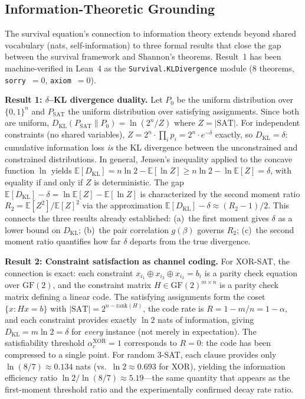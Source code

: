 \documentclass[11pt,a4paper]{article}
\begin{document}
\subsection{Information-Theoretic Grounding}
\label{sec:info-theory-grounding}

The survival equation's connection to information theory extends beyond shared vocabulary (nats, self-information) to three formal results that close the gap between the survival framework and Shannon's theorems. Result~1 has been machine-verified in Lean~4 as the \texttt{Survival.KLDivergence} module (8 theorems, \texttt{sorry}~$= 0$, \texttt{axiom}~$= 0$).

\textbf{Result 1: $\delta$--KL divergence duality.} Let $P_0$ be the uniform distribution over $\{0,1\}^n$ and $P_{\text{SAT}}$ the uniform distribution over satisfying assignments. Since both are uniform, $D_{\text{KL}}(P_{\text{SAT}} \| P_0) = \ln(2^n / Z)$ where $Z = |\text{SAT}|$. For independent constraints (no shared variables), $Z = 2^n \cdot \prod_i p_i = 2^n \cdot e^{-\delta}$ exactly, so $D_{\text{KL}} = \delta$: cumulative information loss \emph{is} the KL divergence between the unconstrained and constrained distributions. In general, Jensen's inequality applied to the concave function $\ln$ yields $\mathbb{E}[D_{\text{KL}}] = n \ln 2 - \mathbb{E}[\ln Z] \geq n \ln 2 - \ln \mathbb{E}[Z] = \delta$, with equality if and only if $Z$ is deterministic. The gap $\mathbb{E}[D_{\text{KL}}] - \delta = \ln \mathbb{E}[Z] - \mathbb{E}[\ln Z]$ is characterized by the second moment ratio $R_2 = \mathbb{E}[Z^2]/\mathbb{E}[Z]^2$ via the approximation $\mathbb{E}[D_{\text{KL}}] - \delta \approx (R_2 - 1)/2$. This connects the three results already established: (a)~the first moment gives $\delta$ as a lower bound on $D_{\text{KL}}$; (b)~the pair correlation $g(\beta)$ governs $R_2$; (c)~the second moment ratio quantifies how far $\delta$ departs from the true divergence.

\textbf{Result 2: Constraint satisfaction as channel coding.} For XOR-SAT, the connection is exact: each constraint $x_{i_1} \oplus x_{i_2} \oplus x_{i_3} = b_i$ is a parity check equation over $\text{GF}(2)$, and the constraint matrix $H \in \text{GF}(2)^{m \times n}$ is a parity check matrix defining a linear code. The satisfying assignments form the coset $\{x : Hx = b\}$ with $|{\text{SAT}}| = 2^{n - \text{rank}(H)}$, the code rate is $R = 1 - m/n = 1 - \alpha$, and each constraint provides exactly $\ln 2$ nats of information, giving $D_{\text{KL}} = m \ln 2 = \delta$ for \emph{every} instance (not merely in expectation). The satisfiability threshold $\alpha_c^{\text{XOR}} = 1$ corresponds to $R = 0$: the code has been compressed to a single point. For random 3-SAT, each clause provides only $\ln(8/7) \approx 0.134$ nats (vs.\ $\ln 2 \approx 0.693$ for XOR), yielding the information efficiency ratio $\ln 2 / \ln(8/7) \approx 5.19$---the same quantity that appears as the first-moment threshold ratio and the experimentally confirmed decay rate ratio.
\end{document}
